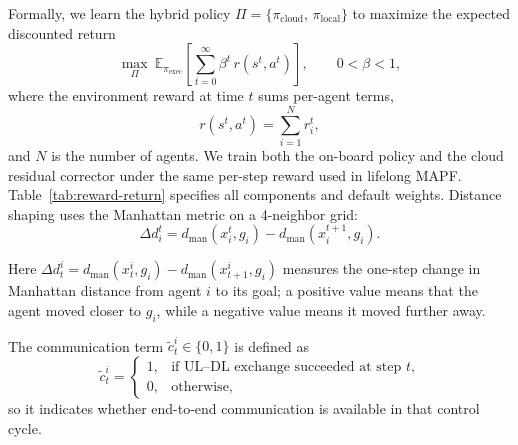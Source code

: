 \documentclass[conference]{IEEEtran}
\begin{document}
Formally, we learn the hybrid policy $\Pi=\{\pi_{\text{cloud}},\,\pi_{\text{local}}\}$ to maximize the expected discounted return
\[
\max_{\Pi}\ \mathbb{E}_{\pi_{\mathrm{exec}}}\!\left[\sum_{t=0}^{\infty}\beta^{t}\, r(s^{t},a^{t})\right],
\qquad 0<\beta<1,
\]
where the environment reward at time $t$ sums per-agent terms,
\[
r(s^{t},a^{t})=\sum_{i=1}^{N} r_i^t,
\]
and $N$ is the number of agents. We train both the on-board policy and the cloud residual corrector under the same per-step reward used in lifelong MAPF. Table~\ref{tab:reward-return} specifies all components and default weights. Distance shaping uses the Manhattan metric on a 4-neighbor grid:
\[
\Delta d_i^t = d_{\text{man}}(x_i^t,g_i)-d_{\text{man}}(x_i^{t+1},g_i).
\]

Here $\Delta d_t^i = d_{\mathrm{man}}(x_t^i, g_i) - d_{\mathrm{man}}(x_{t+1}^i, g_i)$ measures the one-step change in Manhattan distance from agent $i$ to its goal; a positive value means that the agent moved closer to $g_i$, while a negative value means it moved further away. 

The communication term $\tilde c_t^i \in \{0,1\}$ is defined as
\[
\tilde c_t^i =
\begin{cases}
1, & \text{if UL--DL exchange succeeded at step $t$,}\\
0, & \text{otherwise,}
\end{cases}
\]
so it indicates whether end-to-end communication is available in that control cycle.

\end{document}
